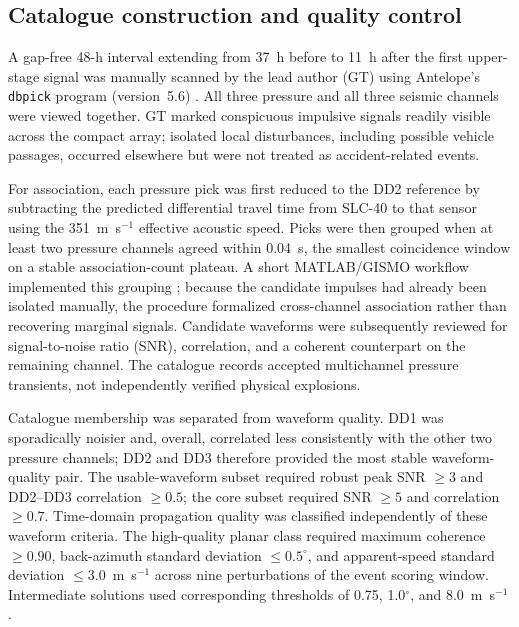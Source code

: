 \documentclass[]{seismica}
\begin{document}
\subsection{Catalogue construction and quality control}

A gap-free 48-h interval extending from 37~h before to 11~h after the first
upper-stage signal was manually scanned by the lead author (GT) using
Antelope's \texttt{dbpick} program (version~5.6) \citep{brtt_antelope}. All three pressure and all three seismic
channels were viewed together. GT marked conspicuous impulsive signals readily
visible across the compact array; isolated local disturbances, including
possible vehicle passages, occurred elsewhere but were not treated as
accident-related events.

For association, each pressure pick was first reduced to the DD2 reference by
subtracting the predicted differential travel time from SLC-40 to that sensor
using the 351~m~s$^{-1}$ effective acoustic speed. Picks were then grouped when
at least two pressure channels agreed within 0.04~s, the smallest coincidence
window on a stable association-count plateau. A short MATLAB/GISMO workflow
implemented this grouping \citep{thompson_gismo_2017}; because the candidate
impulses had already been isolated manually, the procedure formalized
cross-channel association rather than recovering marginal signals. Candidate
waveforms were subsequently reviewed for signal-to-noise ratio (SNR),
correlation, and a coherent counterpart on the remaining channel. The
catalogue records accepted multichannel pressure transients, not independently
verified physical explosions.

Catalogue membership was separated from waveform quality. DD1 was
sporadically noisier and, overall, correlated less consistently with the other
two pressure channels; DD2 and DD3 therefore provided the most stable
waveform-quality pair. The usable-waveform subset required robust peak
SNR $\geq3$ and DD2--DD3 correlation $\geq0.5$; the core subset required
SNR $\geq5$ and correlation $\geq0.7$. Time-domain propagation quality was classified independently of
these waveform criteria. The high-quality planar class required maximum
coherence $\geq0.90$, back-azimuth standard deviation
$\leq0.5^\circ$, and apparent-speed standard deviation
$\leq3.0$~m~s$^{-1}$ across nine perturbations of the event scoring window.
Intermediate solutions used corresponding thresholds of 0.75,
1.0$^\circ$, and 8.0~m~s$^{-1}$.
\end{document}
